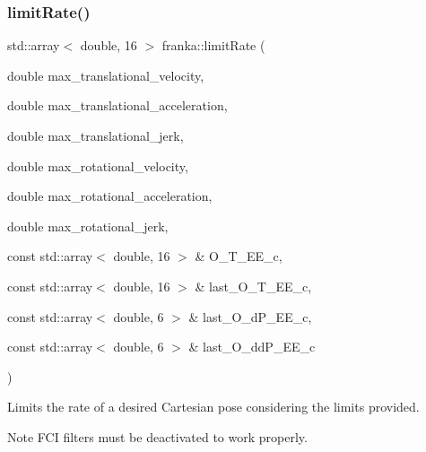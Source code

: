 \subsubsection{\texorpdfstring{limit\+Rate()}{limitRate()}\hspace{0.1cm}{\footnotesize\ttfamily [7/7]}}
{\footnotesize\ttfamily std\+::array$<$ double, 16 $>$ franka\+::limit\+Rate (\begin{DoxyParamCaption}\item[{double}]{max\+\_\+translational\+\_\+velocity,  }\item[{double}]{max\+\_\+translational\+\_\+acceleration,  }\item[{double}]{max\+\_\+translational\+\_\+jerk,  }\item[{double}]{max\+\_\+rotational\+\_\+velocity,  }\item[{double}]{max\+\_\+rotational\+\_\+acceleration,  }\item[{double}]{max\+\_\+rotational\+\_\+jerk,  }\item[{const std\+::array$<$ double, 16 $>$ \&}]{O\+\_\+\+T\+\_\+\+E\+E\+\_\+c,  }\item[{const std\+::array$<$ double, 16 $>$ \&}]{last\+\_\+\+O\+\_\+\+T\+\_\+\+E\+E\+\_\+c,  }\item[{const std\+::array$<$ double, 6 $>$ \&}]{last\+\_\+\+O\+\_\+d\+P\+\_\+\+E\+E\+\_\+c,  }\item[{const std\+::array$<$ double, 6 $>$ \&}]{last\+\_\+\+O\+\_\+dd\+P\+\_\+\+E\+E\+\_\+c }\end{DoxyParamCaption})}

Limits the rate of a desired Cartesian pose considering the limits provided.

\begin{DoxyNote}{Note}
F\+CI filters must be deactivated to work properly.
\end{DoxyNote}

